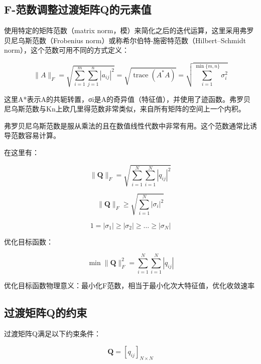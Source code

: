 \subsection{F-范数调整过渡矩阵Q的元素值}

使用特定的矩阵范数（matrix norm，模）来简化之后的迭代运算，这里采用弗罗贝尼乌斯范数（Frobenius norm）或称希尔伯特-施密特范数（Hilbert–Schmidt norm），这个范数可用不同的方式定义：

\begin{equation}
    \|A\|_{F}=\sqrt{\sum_{i=1}^{m} \sum_{j=1}^{n}\left|a_{i j}\right|^{2}}=\sqrt{\operatorname{trace}\left(A^{*} A\right)}=\sqrt{\sum_{i=1}^{\min \{m, n\}} \sigma_{i}^{2}}
\end{equation}

这里A*表示A的共轭转置，σi是A的奇异值（特征值），并使用了迹函数。弗罗贝尼乌斯范数与Kn上欧几里得范数非常类似，来自所有矩阵的空间上一个内积。

弗罗贝尼乌斯范数是服从乘法的且在数值线性代数中非常有用。这个范数通常比诱导范数容易计算。

在这里有：

\begin{equation}
    \|\mathbf{Q}\|_{F}=\sqrt{\sum_{i=1}^{N} \sum_{i=1}^{N}\left|q_{i j}\right|^{2}}
\end{equation}

\begin{equation}
    \|\mathbf{Q}\|_{F} \geq \sqrt{\sum_{i=1}^{N}\left|\sigma_{i}\right|^{2}}
\end{equation}

\begin{equation}
    1=\left|\sigma_{1}\right| \geq\left|\sigma_{2}\right| \geq \ldots \geq\left|\sigma_{N}\right|
\end{equation}

优化目标函数：

\begin{equation}
    \min \|\mathbf{Q}\|_{F}^{2}=\sum_{i=1}^{N} \sum_{i=1}^{N}\left|q_{i j}\right|
\end{equation}

优化目标函数物理意义：最小化F范数，相当于最小化次大特征值，优化收敛速率

\subsection{过渡矩阵Q的约束}

过渡矩阵Q满足以下约束条件：

\begin{equation}
    \mathbf{Q}=\left[q_{i j}\right]_{N \times N}
\end{equation}

